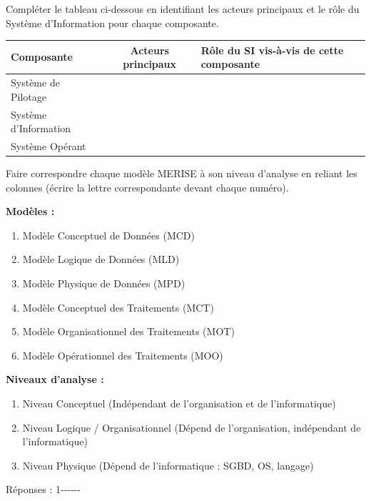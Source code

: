 \documentclass[11pt]{article}
\begin{document}
\begin{exercice}
Compléter le tableau ci-dessous en identifiant les acteurs principaux et le rôle du Système d'Information pour chaque composante.

\begin{tabularx}{\linewidth}{|X|c|X|}
\hline
\textbf{Composante} & \textbf{Acteurs principaux} & \textbf{Rôle du SI vis-à-vis de cette composante} \\
\hline
Système de Pilotage & \dotfill & \dotfill \\
\hline
Système d'Information & \dotfill & \dotfill \\
\hline
Système Opérant & \dotfill & \dotfill \\
\hline
\end{tabularx}
\end{exercice}

\begin{exercice}
Faire correspondre chaque modèle MERISE à son niveau d'analyse en reliant les colonnes (écrire la lettre correspondante devant chaque numéro).

\begin{minipage}{0.48\linewidth}
\textbf{Modèles :}
\begin{enumerate}
    \item Modèle Conceptuel de Données (MCD)
    \item Modèle Logique de Données (MLD)
    \item Modèle Physique de Données (MPD)
    \item Modèle Conceptuel des Traitements (MCT)
    \item Modèle Organisationnel des Traitements (MOT)
    \item Modèle Opérationnel des Traitements (MOO)
\end{enumerate}
\end{minipage}
\hfill
\begin{minipage}{0.48\linewidth}
\textbf{Niveaux d'analyse :}
\begin{enumerate}
    \item[A.] Niveau Conceptuel (Indépendant de l'organisation et de l'informatique)
    \item[B.] Niveau Logique / Organisationnel (Dépend de l'organisation, indépendant de l'informatique)
    \item[C.] Niveau Physique (Dépend de l'informatique : SGBD, OS, langage)
\end{enumerate}
\end{minipage}

\vspace{0.5cm}
\noindent Réponses : 1-\dotfill {}-\dotfill {}-\dotfill {}-\dotfill {}-\dotfill {}-\dotfill
\end{exercice}
\end{document}
